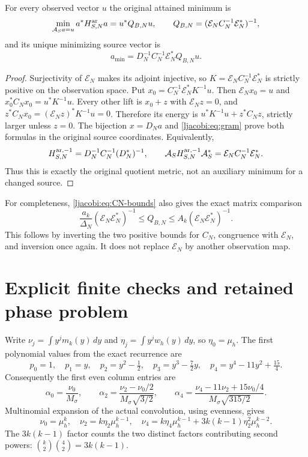 \documentclass[11pt]{article}
\begin{document}
\begin{ljacobitheorem}\label{ljacobi:thm:quotient}
For every observed vector $u$ the original attained minimum is
\begin{equation}\label{ljacobi:eq:quotient}
 \min_{\mathcal A_Sa=u}a^*H_{S,N}^{\rm ar}a
  =u^*Q_{B,N}u,\qquad
 Q_{B,N}=(\mathcal E_NC_N^{-1}\mathcal E_N^*)^{-1},
\end{equation}
and its unique minimizing source vector is
\begin{equation}\label{ljacobi:eq:lift}
 a_{\min}=D_N^{-1}C_N^{-1}\mathcal E_N^*Q_{B,N}u.
\end{equation}
\end{ljacobitheorem}
\begin{proof}
Surjectivity of $\mathcal E_N$ makes its adjoint injective, so
$K=\mathcal E_NC_N^{-1}\mathcal E_N^*$ is strictly positive on the
observation space. Put $x_0=C_N^{-1}\mathcal E_N^*K^{-1}u$.
Then $\mathcal E_Nx_0=u$ and
$x_0^*C_Nx_0=u^*K^{-1}u$. Every other lift is $x_0+z$ with
$\mathcal E_Nz=0$, and
$z^*C_Nx_0=(\mathcal E_Nz)^*K^{-1}u=0$. Therefore its energy is
$u^*K^{-1}u+z^*C_Nz$, strictly larger unless $z=0$.
The bijection $x=D_Na$ and \eqref{ljacobi:eq:gram} prove both formulas in
the original source coordinates. Equivalently,
\[
 H_{S,N}^{{\rm ar},-1}=D_N^{-1}C_N^{-1}(D_N^*)^{-1},\qquad
 \mathcal A_SH_{S,N}^{{\rm ar},-1}\mathcal A_S^*
                   =\mathcal E_NC_N^{-1}\mathcal E_N^*.
\]
Thus this is exactly the original quotient metric, not an auxiliary
minimum for a changed source.
\end{proof}

For completeness, \eqref{ljacobi:eq:CN-bounds} also gives the exact matrix
comparison
\[
 \frac{a_k}{\Delta_N}(\mathcal E_N\mathcal E_N^*)^{-1}
       \leq Q_{B,N}\leq
 A_k(\mathcal E_N\mathcal E_N^*)^{-1}.
\]
This follows by inverting the two positive bounds for $C_N$,
congruence with $\mathcal E_N$, and inversion once again. It does
not replace $\mathcal E_N$ by another observation map.

\section{Explicit finite checks and retained phase problem}

Write $\nu_j=\int y^jm_k(y)\,dy$ and
$\eta_j=\int y^jw_h(y)\,dy$, so $\eta_0=\mu_h$.
The first polynomial values from the exact recurrence are
\[
 p_0=1,\quad p_1=y,\quad p_2=y^2-\tfrac12,\quad
 p_3=y^3-\tfrac72y,\quad p_4=y^4-11y^2+\tfrac{15}4.
\]
Consequently the first even column entries are
\[
 \alpha_0=\frac{\nu_0}{M_\sigma},\qquad
 \alpha_2=\frac{\nu_2-\nu_0/2}{M_\sigma\sqrt{3/2}},\qquad
 \alpha_4=\frac{\nu_4-11\nu_2+15\nu_0/4}
                   {M_\sigma\sqrt{315/2}}.
\]
Multinomial expansion of the actual convolution, using evenness,
gives
\[
 \nu_0=\mu_h^k,\quad \nu_2=k\eta_2\mu_h^{k-1},\quad
 \nu_4=k\eta_4\mu_h^{k-1}
              +3k(k-1)\eta_2^2\mu_h^{k-2}.
\]
The $3k(k-1)$ factor counts the two distinct factors contributing
second powers: $\binom{k}{2}\binom42=3k(k-1)$.
\end{document}

